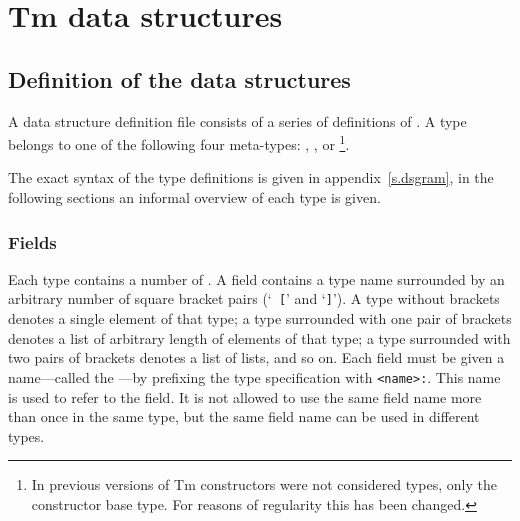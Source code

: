 \chapter{Tm data structures}
\label{s.ds}
\section{Definition of the data structures}
A {\Tm} data structure definition file consists of a series of
definitions of {\Tm} .
A {\Tm} type belongs to one of the following
four meta-types: , , 
or \footnote{In previous versions of Tm
constructors were not considered types, only the constructor base
type. For reasons of regularity this has been changed.}.
\par
The exact syntax of the type definitions is given in appendix~\ref{s.dsgram},
in the following sections an informal overview of each type is given.
\subsection{Fields}
Each type contains a number of . A field contains a type
name surrounded by an arbitrary number of square bracket pairs (`{\tt
[}' and `{\tt ]}').  A type without brackets denotes a single element of
that type; a type surrounded with one pair of brackets denotes a list of
arbitrary length of elements of that type; a type surrounded with two
pairs of brackets denotes a list of lists, and so on.  Each field must
be given a name---called the ---by prefixing the type
specification with \verb'<name>:'.  This name is used to refer to
the field. It is not allowed to use the same field name more than once
in the same type, but the same field name can be used in different types.
